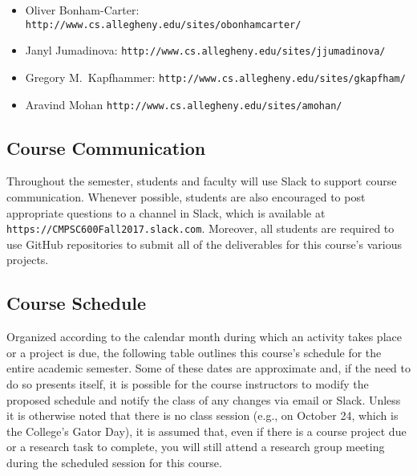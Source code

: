 \documentclass[11pt]{article}
\newcommand{\url}[1]{\lstinline{#1}}
\begin{document}
\vspace*{-.1in}
\begin{itemize}
  \itemsep -.25em
  \item Oliver Bonham-Carter: \url{http://www.cs.allegheny.edu/sites/obonhamcarter/}
  \item Janyl Jumadinova: \url{http://www.cs.allegheny.edu/sites/jjumadinova/}
  \item Gregory M.\ Kapfhammer: \url{http://www.cs.allegheny.edu/sites/gkapfham/}
  \item Aravind Mohan \url{http://www.cs.allegheny.edu/sites/amohan/}
\end{itemize}

\vspace*{-.25in}
\subsection*{Course Communication}

Throughout the semester, students and faculty will use Slack to support course
communication. Whenever possible, students are also encouraged to post
appropriate questions to a channel in Slack, which is available at
\url{https://CMPSC600Fall2017.slack.com}. Moreover, all students are required
to use GitHub repositories to submit all of the deliverables for this course's
various projects.

\vspace*{-.1in}
\subsection*{Course Schedule}

Organized according to the calendar month during which an activity takes place
or a project is due, the following table outlines this course's schedule for the
entire academic semester. Some of these dates are approximate and, if the need
to do so presents itself, it is possible for the course instructors to modify
the proposed schedule and notify the class of any changes via email or Slack.
Unless it is otherwise noted that there is no class session (e.g., on October
24, which is the College's Gator Day), it is assumed that, even if there is a
course project due or a research task to complete, you will still attend a
research group meeting during the scheduled session for this course.
\end{document}
